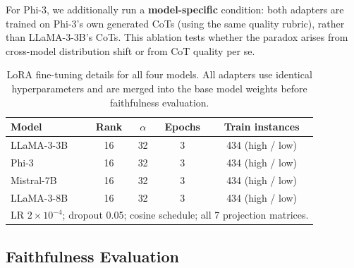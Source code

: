 \documentclass[11pt]{article}
\begin{document}
For Phi-3, we additionally run a \textbf{model-specific} condition: both
adapters are trained on Phi-3's own generated CoTs (using the same quality
rubric), rather than LLaMA-3-3B's CoTs. This ablation tests whether the
paradox arises from cross-model distribution shift or from CoT quality per se.

\begin{table}[t]
\centering
\small
\caption{LoRA fine-tuning details for all four models.
All adapters use identical hyperparameters and are merged into the
base model weights before faithfulness evaluation.}
\label{tab:lora}
\begin{tabular}{lcccc}
\toprule
Model & Rank & $\alpha$ & Epochs & Train instances \\
\midrule
LLaMA-3-3B  & 16 & 32 & 3 & 434 (high / low) \\
Phi-3        & 16 & 32 & 3 & 434 (high / low) \\
Mistral-7B   & 16 & 32 & 3 & 434 (high / low) \\
LLaMA-3-8B   & 16 & 32 & 3 & 434 (high / low) \\
\midrule
\multicolumn{5}{l}{\small LR $2{\times}10^{-4}$; dropout 0.05; cosine schedule; all 7 projection matrices.} \\
\bottomrule
\end{tabular}
\end{table}

\subsection{Faithfulness Evaluation}
\end{document}
